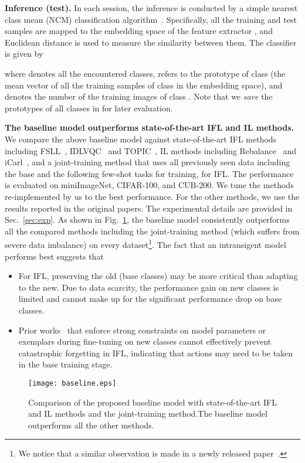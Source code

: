 \documentclass{article}
\begin{document}
\textbf{Inference (test).}
In each session, the inference is conducted by a simple nearest class mean (NCM) classification algorithm~\citep{mensink2013distance}. Specifically, all the training and test samples are mapped to the embedding space of the feature extractor , and Euclidean distance  is used to measure the similarity between them. The classifier is given by

where  denotes all the encountered classes,  refers to the prototype of class  (the mean vector of all the training samples of class  in the embedding space), and  denotes the number of the training images of class . Note that we \textit{save} the prototypes of all classes in  for later evaluation. 

\textbf{The baseline model outperforms state-of-the-art IFL and IL methods.} We compare the above baseline model against state-of-the-art IFL methods including FSLL~\citep{FSLL}, IDLVQC~\citep{IDLVQC} and TOPIC~\citep{TOPIC}, IL methods including Rebalance~\citep{NCM} and iCarl~\citep{icarl}, and a joint-training method that uses all previously seen data including the base and the following few-shot tasks for training, for IFL. The performance is evaluated on miniImageNet, CIFAR-100, and CUB-200. We tune the methods re-implemented by us to the best performance. For the other methods, we use the results reported in the original papers. The experimental details are provided in Sec.~\ref{sec:exp}.
As shown in Fig.~\ref{fig_table1}, the baseline model consistently outperforms all the compared methods including the joint-training method (which suffers from severe data imbalance) on every dataset\footnote{We notice that a similar observation is made in a newly released paper~\citep{zhang2021few}.}. The fact that an intransigent model performs best suggests that 
\begin{itemize}
    \item For IFL, preserving the old (base classes) may be more critical than adapting to the new. Due to data scarcity, the performance gain on new classes is limited and cannot make up for the significant performance drop on base classes. 
    \item Prior works~\citep{TOPIC,IDLVQC,FSLL,NCM,icarl} that enforce strong constraints on model parameters or exemplars during fine-tuning on new classes cannot effectively prevent catastrophic forgetting in IFL, indicating that actions may need to be taken in the base training stage.
\end{itemize}

\begin{figure}
    \centering
  \texttt{[image: baseline.eps]}
  \caption{Comparison of the proposed baseline model with state-of-the-art IFL and IL methods and the joint-training method.The baseline model outperforms all the other methods.}
  \label{fig_table1}
\end{figure}
\end{document}
